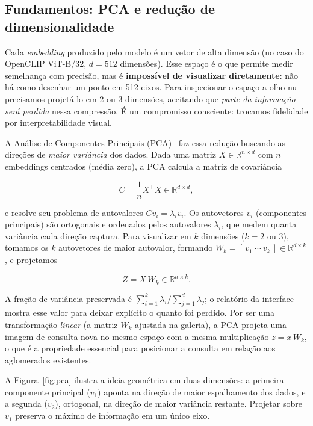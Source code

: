 \documentclass[10pt]{article}
\begin{document}
\subsection{Fundamentos: PCA e redução de dimensionalidade}

Cada \emph{embedding} produzido pelo modelo é um vetor de alta dimensão (no caso
do OpenCLIP ViT-B/32, $d = 512$ dimensões). Esse espaço é o que permite medir
semelhança com precisão, mas é \textbf{impossível de visualizar diretamente}:
não há como desenhar um ponto em 512 eixos. Para inspecionar o espaço a olho nu
precisamos projetá-lo em 2 ou 3 dimensões, aceitando que \emph{parte da
informação será perdida} nessa compressão. É um compromisso consciente: trocamos
fidelidade por interpretabilidade visual.

A Análise de Componentes Principais (PCA)~\cite{jolliffe2002pca} faz essa
redução buscando as direções de \emph{maior variância} dos dados. Dada uma
matriz $X \in \mathbb{R}^{n \times d}$ com $n$ embeddings centrados (média zero),
a PCA calcula a matriz de covariância

\[
  C = \frac{1}{n} X^\top X \in \mathbb{R}^{d \times d},
\]

e resolve seu problema de autovalores $C v_i = \lambda_i v_i$. Os autovetores
$v_i$ (componentes principais) são ortogonais e ordenados pelos autovalores
$\lambda_i$, que medem quanta variância cada direção captura. Para visualizar em
$k$ dimensões ($k = 2$ ou $3$), tomamos os $k$ autovetores de maior autovalor,
formando $W_k = [\,v_1\ \cdots\ v_k\,] \in \mathbb{R}^{d \times k}$, e projetamos

\[
  Z = X\,W_k \in \mathbb{R}^{n \times k}.
\]

A fração de variância preservada é $\sum_{i=1}^{k} \lambda_i \big/
\sum_{j=1}^{d} \lambda_j$; o relatório da interface mostra esse valor para deixar
explícito o quanto foi perdido. Por ser uma transformação \emph{linear} (a
matriz $W_k$ ajustada na galeria), a PCA projeta uma imagem de consulta nova no
mesmo espaço com a mesma multiplicação $z = x\,W_k$, o que é a propriedade
essencial para posicionar a consulta em relação aos aglomerados existentes.

A Figura~\ref{fig:pca} ilustra a ideia geométrica em duas dimensões: a primeira
componente principal ($v_1$) aponta na direção de maior espalhamento dos dados,
e a segunda ($v_2$), ortogonal, na direção de maior variância restante. Projetar
sobre $v_1$ preserva o máximo de informação em um único eixo.
\end{document}
